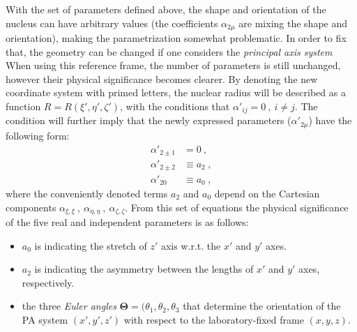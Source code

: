 With the set of parameters defined above, the shape and orientation of the nucleus can have arbitrary values (the coefficients $\alpha_{2\mu}$ are mixing the shape and orientation), making the parametrization somewhat problematic. In order to fix that, the geometry can be changed if one considers the \emph{principal axis system}
When using this reference frame, the number of parameters is still unchanged, however their physical significance becomes clearer. By denoting the new coordinate system with primed letters, the nuclear radius will be described as a function $R=R(\xi',\eta',\zeta')$, with the conditions that $\alpha'_{ij}=0\ ,\ i\neq j$. The condition will further imply that the newly expressed parameters ($\alpha'_{2\mu}$) have the following form:
\begin{align}
    \alpha'_{2 \pm 1}&=0\ , \nonumber \\
    \alpha'_{2 \pm 2}&\equiv a_2\ , \nonumber \\
    \alpha'_{20}&\equiv a_0\ ,
\end{align}
where the conveniently denoted terms $a_2$ and $a_0$ depend on the Cartesian components $\alpha_{\xi,\xi}\ ,\ \alpha_{\eta,\eta}\ ,\ \alpha_{\zeta,\zeta}$. From this set of equations the physical significance of the five real and independent parameters is as follows:
\begin{itemize}
    \item $a_0$ is indicating the stretch of $z'$ axis w.r.t. the $x'$ and $y'$ axes.
    \item $a_2$ is indicating the asymmetry between the lengths of $x'$ and $y'$ axes, respectively.
    \item the three \emph{Euler angles} $\mathbf{\Theta}=(\theta_1,\theta_2,\theta_3$ that determine the orientation of the PA system $(x',y',z')$ with respect to the laboratory-fixed frame $(x,y,z)$.
\end{itemize}

